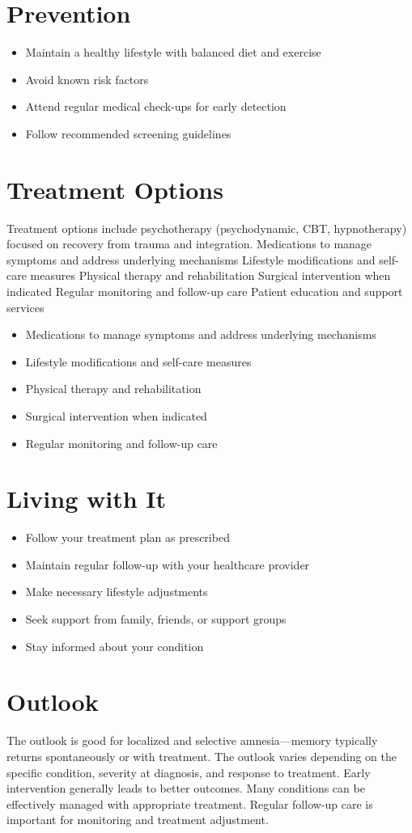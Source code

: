 \section{Prevention}
\begin{itemize}[noitemsep]
  \item Maintain a healthy lifestyle with balanced diet and exercise
  \item Avoid known risk factors
  \item Attend regular medical check-ups for early detection
  \item Follow recommended screening guidelines
\end{itemize}
\section{Treatment Options}
Treatment options include psychotherapy (psychodynamic, CBT, hypnotherapy) focused on recovery from trauma and integration. Medications to manage symptoms and address underlying mechanisms Lifestyle modifications and self-care measures Physical therapy and rehabilitation Surgical intervention when indicated Regular monitoring and follow-up care Patient education and support services

\begin{itemize}[noitemsep]
  \item Medications to manage symptoms and address underlying mechanisms
  \item Lifestyle modifications and self-care measures
  \item Physical therapy and rehabilitation
  \item Surgical intervention when indicated
  \item Regular monitoring and follow-up care
\end{itemize}
\section{Living with It}
\begin{itemize}[noitemsep]
  \item Follow your treatment plan as prescribed
  \item Maintain regular follow-up with your healthcare provider
  \item Make necessary lifestyle adjustments
  \item Seek support from family, friends, or support groups
  \item Stay informed about your condition
\end{itemize}
\section{Outlook}
The outlook is good for localized and selective amnesia---memory typically returns spontaneously or with treatment. The outlook varies depending on the specific condition, severity at diagnosis, and response to treatment. Early intervention generally leads to better outcomes. Many conditions can be effectively managed with appropriate treatment. Regular follow-up care is important for monitoring and treatment adjustment.
